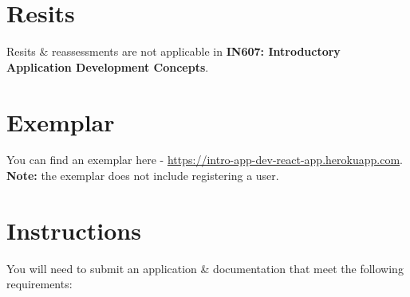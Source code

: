 \documentclass{article}
\begin{document}
\section*{Resits}
Resits \& reassessments are not applicable in \textbf{IN607: Introductory Application Development Concepts}. 

\newpage

\section*{Exemplar}
You can find an exemplar here - \small\href{https://intro-app-dev-react-app.herokuapp.com}{https://intro-app-dev-react-app.herokuapp.com}. \textbf{Note:} the exemplar does not include registering a user.

\section*{Instructions}
You will need to submit an application \& documentation that meet the following requirements:
\end{document}
